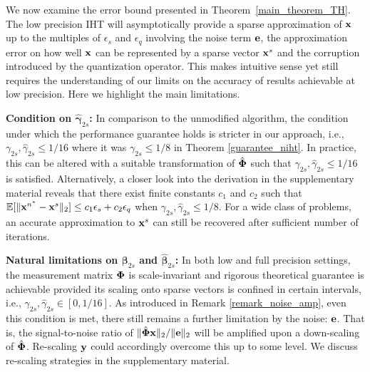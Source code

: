\documentclass{article}
\begin{document}
We now examine the error bound presented in Theorem~\ref{main_theorem_TH}. The low precision IHT will asymptotically provide a sparse approximation of ${\bf x}$ up to the multiples of $ {\epsilon}_s$ and $ {\epsilon}_q$ involving the noise term ${\bf e}$, the approximation error on how well ${\bf x}$ can be represented by a sparse vector ${\bf x}^s$ and the corruption introduced by the quantization operator. This makes intuitive sense yet still requires the understanding of our limits on the accuracy of results achievable at low precision. Here we highlight the main limitations.
\vspace{-.3em}

{\bf Condition on $\hat{\boldsymbol{\gamma}}_{2s}$:} In comparison to the unmodified algorithm, the condition under which the performance guarantee holds is stricter in our approach, i.e., ${\gamma}_{2s}, \hat{\gamma}_{2s}\leq 1/16$ where it was ${\gamma}_{2s}\leq 1/8$ in Theorem \ref{guarantee_niht}. In practice, this can be altered with a suitable transformation of $\hat{\bf \Phi}$ such that ${\gamma}_{2s}, \hat{\gamma}_{2s}\leq 1/16$ is satisfied. Alternatively, a closer look into the derivation in the supplementary material reveals that there exist finite constants $c_1$ and $c_2$ such that $\mathbb{E}[\|{\bf x}^{n^*}-{\bf x}^s \|_2] \leq c_1\epsilon_s + c_2\epsilon_q$ when ${\gamma}_{2s}, \hat{\gamma}_{2s}\leq 1/8$. For a wide class of problems, an accurate approximation to ${\bf x}^s$ can still be recovered after sufficient number of iterations.
\vspace{-.3em}


{\bf Natural limitations on ${\boldsymbol{\beta}}_{2s}$ and $\hat{\boldsymbol{\beta}}_{2s}$:} In both low and full precision settings, the measurement matrix ${\bf \Phi}$ is scale-invariant and rigorous theoretical guarantee is achievable provided its scaling onto sparse vectors is confined in certain intervals, i.e., ${\gamma}_{2s}, \hat{\gamma}_{2s}\in [0, 1/16]$. As introduced in Remark \ref{remark_noise_amp}, even this condition is met, there still remains a further limitation by the noise: ${\bf e}$. That is, the signal-to-noise ratio of $\|\hat{\bf \Phi} {\bf x} \|_2/\|{\bf e} \|_2$ will be amplified upon a down-scaling of $\hat{\bf \Phi}$. Re-scaling ${\bf y}$ could accordingly overcome this up to some level. 
{We discuss re-scaling strategies in the supplementary material.}
\end{document}
